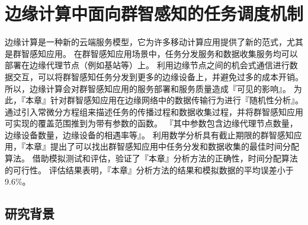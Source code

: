 
\chapter{边缘计算中面向群智感知的任务调度机制}


边缘计算是一种新的云端服务模型，它为许多移动计算应用提供了新的范式，尤其是群智感知应用。
在群智感知应用场景中，任务分发服务和数据收集服务均可以部署在边缘代理节点（例如基站等）上。
利用边缘节点之间的机会式通信进行数据交互，可以将群智感知任务分发到更多的边缘设备上，并避免过多的成本开销。
所以，边缘计算会对群智感知应用的服务部署和服务质量造成『可见的影响』。
为此，『本章』针对群智感知应用在边缘网络中的数据传输行为进行『随机性分析』。
通过引入常微分方程组来描述任务的传播过程和数据收集过程，并将群智感知应用可实现的覆盖范围推到为带有参数的函数。
『其中参数包含边缘代理节点数量，边缘设备数量，边缘设备的相遇率等』。
利用数学分析具有截止期限的群智感知应用，『本章』提出了可以找出群智感知应用中任务分发和数据收集的最佳时间分配算法。
借助模拟测试和评估，验证了『本章』分析方法的正确性，时间分配算法的可行性。
评估结果表明，『本章』分析方法的结果和模拟数据的平均误差小于 9.6\%。

\section{研究背景}


